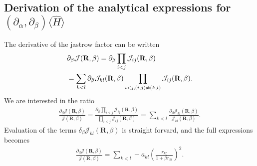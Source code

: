 \documentclass[a4paper,10pt,twocolumn]{article} %
\newcommand{\ts}[1]{\textbf{#1}}
\newcommand{\expec}[1]{\langle{}{#1}\rangle{}}
\begin{document}
\begin{appendix}
\section{Derivation of the analytical expressions for $(\partial_\alpha,\partial_\beta)\expec{\hat H}$}%

The derivative of the jastrow factor can be written
\begin{align}
	&\partial_\beta \mathcal J(\ts R,\beta) =\partial_\beta \prod_{i<j} \mathcal J_{ij}(\ts R,\beta)\notag\\ 
	&= \sum_{k<l}\partial_\beta \mathcal J_{kl}(\ts R,\beta) 
		\prod_{
			i<j,
			(i,j)\neq(k,l) 
		}
	\mathcal J_{ij}(\ts R,\beta).
\end{align}
We are interested in the ratio
\begin{align}
	\frac{\partial_\beta\mathcal J(\ts R,\beta)}{\mathcal J(\ts R,\beta)}
	=\frac{\partial_\beta \prod_{i<j} \mathcal J_{ij}(\ts R,\beta) }
	{\prod_{i<j} \mathcal J_{ij}(\ts R,\beta)}
	= \sum_{k<l}\frac{\partial_\beta \mathcal J_{kl}(\ts R,\beta)}{\mathcal J_{kl}(\ts R,\beta)}.
\end{align}
Evaluation of the terms $\delta_\beta \mathcal J_{kl}(\ts R,\beta)$ is straight forvard, and the full expressions becomes
\begin{align}
	\frac{\partial_\beta\mathcal J(\ts R,\beta)}{\mathcal J(\ts R,\beta)}
	=	
	\sum_{k<l}-a_{kl}
	\left( 
		\frac {r_{kl}} {1+\beta r_{kl}}
	\right)^2.
\end{align}


\end{appendix}
\end{document}
